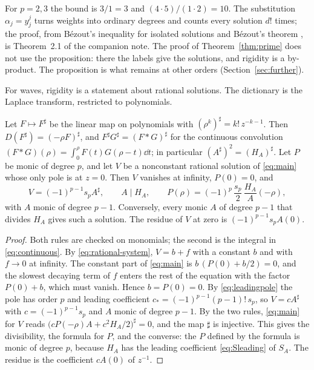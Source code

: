 For \(p=2,3\) the bound is \(3/1=3\) and \((4\cdot5)/(1\cdot2)=10\). The
substitution \(\alpha_j=y_j^j\) turns weights into ordinary degrees and
counts every solution \(d!\) times; the proof, from B\'ezout's inequality
for isolated solutions \citep[Chapter~VIII]{Mondal2021} and B\'ezout's
theorem \citep{CoxLittleOShea2005}, is Theorem~2.1 of the companion
note. The proof of Theorem~\ref{thm:prime} does not use the proposition:
there the labels give the solutions, and rigidity is a by-product. The
proposition is what remains at other orders (Section~\ref{sec:further}).

For waves, rigidity is a statement about rational solutions. The
dictionary is the Laplace transform, restricted to polynomials.

\begin{lemma}\label{lem:laplace}
Let \(F\mapsto F^\sharp\) be the linear map on polynomials with
\((\rho^k)^\sharp=k!\,z^{-k-1}\). Then \(D(F^\sharp)=(-\rho F)^\sharp\),
and \(F^\sharp G^\sharp=(F\ast G)^\sharp\) for the continuous convolution
\((F\ast G)(\rho)=\int_0^\rho F(t)G(\rho-t)\dd t\); in particular
\((A^\sharp)^2=(H_A)^\sharp\).
Let \(P\) be monic of degree \(p\), and let \(V\) be a nonconstant
rational solution of \eqref{eq:main} whose only pole is at \(z=0\).
Then \(V\) vanishes at infinity, \(P(0)=0\), and
\[
 V=(-1)^{p-1}s_pA^\sharp,\qquad A\mid H_A,\qquad
 P(\rho)=(-1)^p\,\frac{s_p}{2}\,\frac{H_A}{A}(-\rho),
\]
with \(A\) monic of degree \(p-1\). Conversely, every monic \(A\) of
degree \(p-1\) that divides \(H_A\) gives such a solution. The residue
of \(V\) at zero is \((-1)^{p-1}s_pA(0)\).
\end{lemma}

\begin{proof}
Both rules are checked on monomials; the second is the integral in
\eqref{eq:continuous}. By \eqref{eq:rational-system}, \(V=b+f\) with a
constant \(b\) and with \(f\to0\) at infinity. The constant part of
\eqref{eq:main} is \(b\,(P(0)+b/2)=0\), and the slowest decaying term of
\(f\) enters the rest of the equation with the factor \(P(0)+b\), which
must vanish. Hence \(b=P(0)=0\). By \eqref{eq:leadingpole} the pole has
order \(p\) and leading coefficient \(c_\ast=(-1)^{p-1}(p-1)!\,s_p\), so
\(V=cA^\sharp\) with \(c=(-1)^{p-1}s_p\) and \(A\) monic of degree
\(p-1\). By the two rules, \eqref{eq:main} for \(V\) reads
\(\bigl(cP(-\rho)A+c^2H_A/2\bigr)^\sharp=0\), and the map \(\sharp\) is
injective. This gives the divisibility, the formula for \(P\), and the
converse: the \(P\) defined by the formula is monic of degree \(p\),
because \(H_A\) has the leading coefficient \eqref{eq:Sleading} of
\(S_A\). The residue is the coefficient \(cA(0)\) of \(z^{-1}\).
\end{proof}

